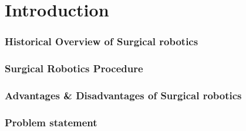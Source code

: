 \section{Introduction}

\begin{frame}
\frametitle{Historical Overview of Surgical robotics}
\end{frame}

\begin{frame}
\frametitle{Surgical Robotics Procedure}
\end{frame}

\begin{frame}
\frametitle{Advantages \& Disadvantages of Surgical robotics}
\end{frame}

\begin{frame}
\frametitle{Problem statement}
\end{frame}